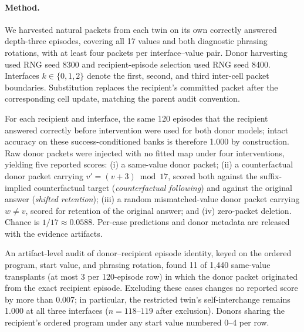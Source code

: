 \documentclass[11pt]{article}
\begin{document}
\paragraph{Method.}
We harvested natural packets from each twin on its own correctly answered depth-three episodes, covering all 17 values and both diagnostic phrasing rotations, with at least four packets per interface--value pair. Donor harvesting used RNG seed 8300 and recipient-episode selection used RNG seed 8400. Interfaces $k\in\{0,1,2\}$ denote the first, second, and third inter-cell packet boundaries. Substitution replaces the recipient's committed packet after the corresponding cell update, matching the parent audit convention.

For each recipient and interface, the same 120 episodes that the recipient answered correctly before intervention were used for both donor models; intact accuracy on these success-conditioned banks is therefore 1.000 by construction. Raw donor packets were injected with no fitted map under four interventions, yielding five reported scores: (i) a same-value donor packet; (ii) a counterfactual donor packet carrying $v'=(v{+}3)\bmod 17$, scored both against the suffix-implied counterfactual target (\emph{counterfactual following}) and against the original answer (\emph{shifted retention}); (iii) a random mismatched-value donor packet carrying $w\neq v$, scored for retention of the original answer; and (iv) zero-packet deletion. Chance is $1/17\approx0.0588$. Per-case predictions and donor metadata are released with the evidence artifacts.

An artifact-level audit of donor--recipient episode identity, keyed on the ordered program, start value, and phrasing rotation, found 11 of 1{,}440 same-value transplants (at most 3 per 120-episode row) in which the donor packet originated from the exact recipient episode. Excluding these cases changes no reported score by more than 0.007; in particular, the restricted twin's self-interchange remains 1.000 at all three interfaces ($n=118$--$119$ after exclusion). Donors sharing the recipient's ordered program under any start value numbered 0--4 per row.
\end{document}
